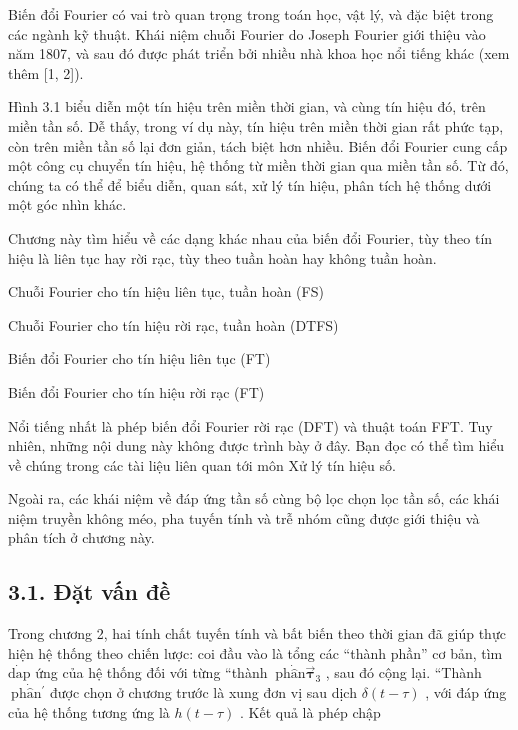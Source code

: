 \documentclass[
  10
]{article}
\begin{document}
Biến đổi Fourier có vai trò quan trọng trong toán học, vật lý, và đặc
biệt trong các ngành kỹ thuật. Khái niệm chuỗi Fourier do Joseph Fourier
giới thiệu vào năm 1807, và sau đó được phát triển bởi nhiều nhà khoa
học nổi tiếng khác (xem thêm {[}1, 2{]}).

Hình 3.1 biểu diễn một tín hiệu trên miền thời gian, và cùng tín hiệu
đó, trên miền tần số. Dễ thấy, trong ví dụ này, tín hiệu trên miền thời
gian rất phức tạp, còn trên miền tần số lại đơn giản, tách biệt hơn
nhiều. Biến đổi Fourier cung cấp một công cụ chuyển tín hiệu, hệ thống
từ miền thời gian qua miền tần số. Từ đó, chúng ta có thể để biểu diễn,
quan sát, xử lý tín hiệu, phân tích hệ thống dưới một góc nhìn khác.

Chương này tìm hiểu về các dạng khác nhau của biến đổi Fourier, tùy theo
tín hiệu là liên tục hay rời rạc, tùy theo tuần hoàn hay không tuần
hoàn.

Chuỗi Fourier cho tín hiệu liên tục, tuần hoàn (FS)

Chuỗi Fourier cho tín hiệu rời rạc, tuần hoàn (DTFS)

Biến đổi Fourier cho tín hiệu liên tục (FT)

Biến đổi Fourier cho tín hiệu rời rạc (FT)

Nổi tiếng nhất là phép biến đổi Fourier rời rạc (DFT) và thuật toán FFT.
Tuy nhiên, những nội dung này không được trình bày ở đây. Bạn đọc có thể
tìm hiểu về chúng trong các tài liệu liên quan tới môn Xử lý tín hiệu
số.

Ngoài ra, các khái niệm về đáp ứng tần số cùng bộ lọc chọn lọc tần số,
các khái niệm truyền không méo, pha tuyến tính và trễ nhóm cũng được
giới thiệu và phân tích ở chương này.

\subsection{3.1. Đặt vấn đề}\label{ux111ux1eb7t-vux1ea5n-ux111ux1ec1}

Trong chương 2, hai tính chất tuyến tính và bất biến theo thời gian đã
giúp thực hiện hệ thống theo chiến lược: coi đầu vào là tổng các ``thành
phần'' cơ bản, tìm \(\mathrm { \dot { d a p } }\) ứng của hệ thống đối
với từng ``thành
\(\mathrm { \ p h { \dot { \hat { a } } } n { \vec { \mathbf { \tau } } } _ { 3 } }\)
, sau đó cộng lại. ``Thành
\(\mathrm { \ p h { \dot { \hat { a } } } n ^ { \prime } }\) được chọn ở
chương trước là xung đơn vị sau dịch \(\delta ( t - \tau )\) , với đáp
ứng của hệ thống tương ứng là \(h ( t - \tau )\) . Kết quả là phép chập
\end{document}
